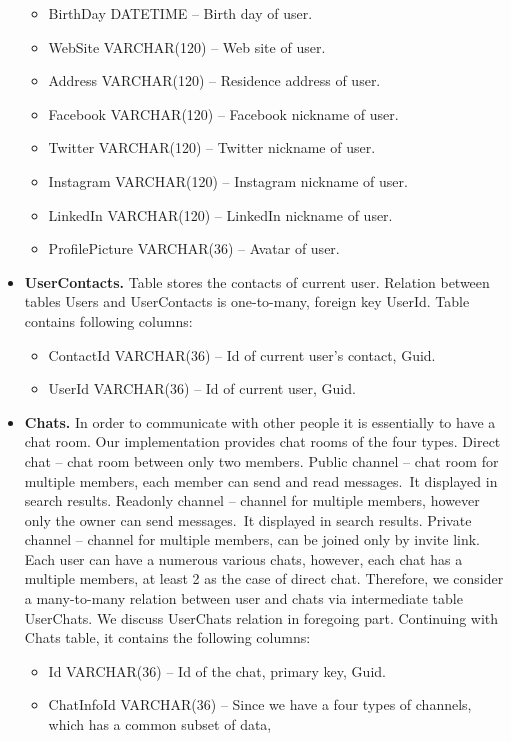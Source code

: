 \begin{itemize}
\begin{itemize}
        \item BirthDay DATETIME -- Birth day of user.
        \item WebSite VARCHAR(120) -- Web site of user.
        \item Address VARCHAR(120) -- Residence address of user.
        \item Facebook VARCHAR(120) -- Facebook nickname of user.
        \item Twitter VARCHAR(120) -- Twitter nickname of user.
        \item Instagram VARCHAR(120) -- Instagram nickname of user.
        \item LinkedIn VARCHAR(120) -- LinkedIn nickname of user.
        \item ProfilePicture VARCHAR(36) -- Avatar of user.
    \end{itemize}
    \item \textbf{UserContacts.} Table stores the contacts of current user.
    Relation between tables Users and UserContacts is one-to-many, foreign key UserId.
    Table contains following columns:
    \begin{itemize}
        \item ContactId VARCHAR(36) -- Id of current user's contact, Guid.
        \item UserId VARCHAR(36) -- Id of current user, Guid.
    \end{itemize}
    \item \textbf{Chats.} In order to communicate with other people it is essentially to have a chat room.
    Our implementation provides chat rooms of the four types.
    Direct chat -- chat room between only two members.
    Public channel -- chat room for multiple members, each member can send and read messages.\ It displayed in search results.
    Readonly channel -- channel for multiple members, however only the owner can send messages.\ It displayed in search results.
    Private channel -- channel for multiple members, can be joined only by invite link.
    Each user can have a numerous various chats, however, each chat has a multiple members, at least 2 as the case of direct chat.
    Therefore, we consider a many-to-many relation between user and chats via intermediate table UserChats.
    We discuss UserChats relation in foregoing part.
    Continuing with Chats table, it contains the following columns:
    \begin{itemize}
        \item Id VARCHAR(36) -- Id of the chat, primary key, Guid.
        \item ChatInfoId VARCHAR(36) -- Since we have a four types of channels, which has a common subset of data,

\end{itemize}
\end{itemize}
